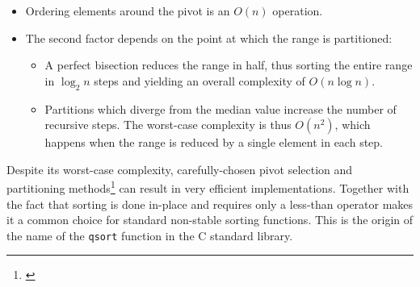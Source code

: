 
\begin{itemize}
    \item Ordering elements around the pivot is an $O(n)$ operation.
    \item
        The second factor depends on the point at which the range is
        partitioned:
        \begin{itemize}
            \item
                A perfect bisection reduces the range in half, thus sorting the
                entire range in $\log_2 n$ steps and yielding an overall
                complexity of $O(n \log n)$.
            \item
                Partitions which diverge from the median value increase the
                number of recursive steps.  The worst-case complexity is thus
                $O(n^2)$, which happens when the range is reduced by a single
                element in each step.
        \end{itemize}
\end{itemize}

Despite its worst-case complexity, carefully-chosen pivot selection and
partitioning methods\footnote{\cite{Bentley1993}} can result in very efficient
implementations.  Together with the fact that sorting is done in-place and
requires only a less-than operator makes it a common choice for standard
non-stable sorting functions.  This is the origin of the name of the
\texttt{qsort} function in the C standard library.
